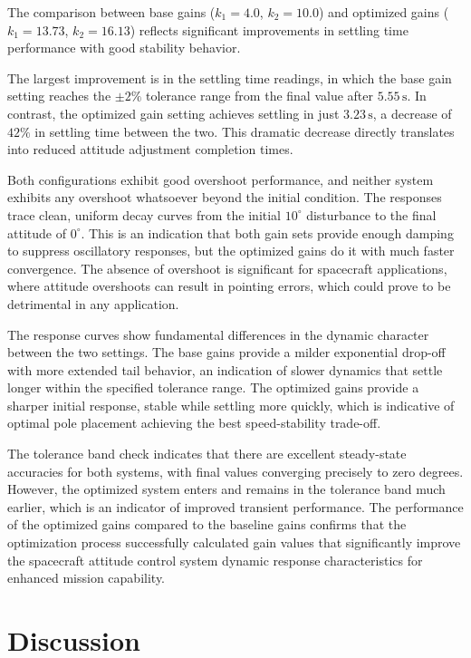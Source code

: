 \documentclass{ifacconf}
\begin{document}
The comparison between base gains ($k_1=4.0$, $k_2=10.0$) and optimized gains ($k_1=13.73$, $k_2=16.13$) reflects significant improvements in settling time performance with good stability behavior.

The largest improvement is in the settling time readings, in which the base gain setting reaches the $\pm 2\%$ tolerance range from the final value after $5.55\,\text{s}$. In contrast, the optimized gain setting achieves settling in just $3.23\,\text{s}$, a decrease of $42\%$ in settling time between the two. This dramatic decrease directly translates into reduced attitude adjustment completion times.

Both configurations exhibit good overshoot performance, and neither system exhibits any overshoot whatsoever beyond the initial condition. The responses trace clean, uniform decay curves from the initial $10^\circ$ disturbance to the final attitude of $0^\circ$. This is an indication that both gain sets provide enough damping to suppress oscillatory responses, but the optimized gains do it with much faster convergence. The absence of overshoot is significant for spacecraft applications, where attitude overshoots can result in pointing errors, which could prove to be detrimental in any application.

The response curves show fundamental differences in the dynamic character between the two settings. The base gains provide a milder exponential drop-off with more extended tail behavior, an indication of slower dynamics that settle longer within the specified tolerance range. The optimized gains provide a sharper initial response, stable while settling more quickly, which is indicative of optimal pole placement achieving the best speed-stability trade-off.

The tolerance band check indicates that there are excellent steady-state accuracies for both systems, with final values converging precisely to zero degrees. However, the optimized system enters and remains in the tolerance band much earlier, which is an indicator of improved transient performance. The performance of the optimized gains compared to the baseline gains confirms that the optimization process successfully calculated gain values that significantly improve the spacecraft attitude control system dynamic response characteristics for enhanced mission capability.


\section{Discussion}
\end{document}
